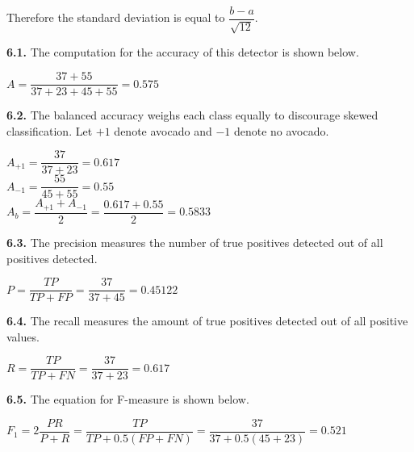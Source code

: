 \documentclass[12pt]{article}
\begin{document}
Therefore the standard deviation is equal to $\dfrac{b-a}{\sqrt{12}}$. 

{\bf 6.1.} The computation for the accuracy of this detector is shown below.

\begin{center}

$A=\dfrac{37+55}{37+23+45+55}=0.575$\\

\end{center}

{\bf 6.2.} The balanced accuracy weighs each class equally to discourage skewed classification. Let $+1$ denote avocado and $-1$ denote no avocado.

\begin{center}

$A_{+1}=\dfrac{37}{37+23}=0.617$\\
\bigskip
$A_{-1}=\dfrac{55}{45+55}=0.55$\\
\bigskip
$A_{b}=\dfrac{A_{+1}+A_{-1}}{2}=\dfrac{0.617+0.55}{2}=0.5833$\\

\end{center}

{\bf 6.3.} The precision measures the number of true positives detected out of all positives detected.

\begin{center}

$P=\dfrac{TP}{TP+FP}=\dfrac{37}{37+45}=0.45122$\\

\end{center}

{\bf 6.4.} The recall measures the amount of true positives detected out of all positive values.

\begin{center}

$R=\dfrac{TP}{TP+FN}=\dfrac{37}{37+23}=0.617$\\

\end{center}

{\bf 6.5.} The equation for F-measure is shown below.

\begin{center}

$F_{1}=2\dfrac{PR}{P+R}=\dfrac{TP}{TP+0.5(FP+FN)}=\dfrac{37}{37+0.5(45+23)}=0.521$\\

\end{center}
\end{document}
